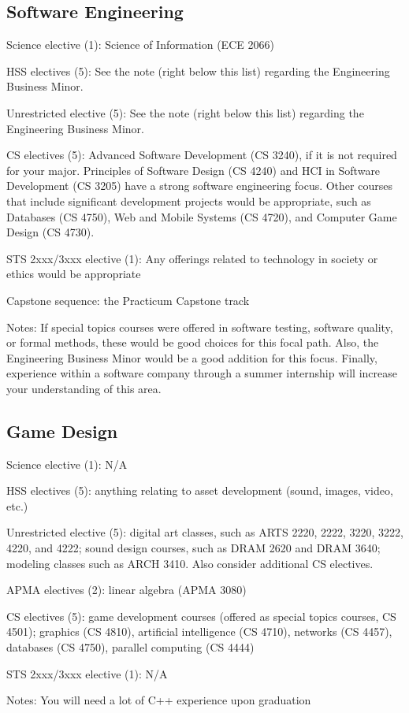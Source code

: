 \subsection{Software Engineering}
\begin{itemlist}
\item Science elective (1): Science of Information (ECE 2066)
\item HSS electives (5): See the note (right below this list)
  regarding the Engineering Business Minor.
\item Unrestricted elective (5): See the note (right below this list)
  regarding the Engineering Business Minor.
\item CS electives (5): Advanced Software Development (CS 3240), if it
  is not required for your major.  Principles of Software Design (CS
  4240) and HCI in Software Development (CS 3205) have a strong
  software engineering focus. Other courses that include significant
  development projects would be appropriate, such as Databases (CS
  4750), Web and Mobile Systems (CS 4720), and Computer Game Design
  (CS 4730).
\item STS 2xxx/3xxx elective (1): Any offerings related to technology
  in society or ethics would be appropriate
\item Capstone sequence: the Practicum Capstone track
\end{itemlist}

Notes: If special topics courses were offered in software testing,
software quality, or formal methods, these would be good choices for
this focal path. Also, the Engineering Business Minor would be a good
addition for this focus. Finally, experience within a software company
through a summer internship will increase your understanding of this
area.


\subsection{Game Design}
\begin{itemlist}
\item Science elective (1): N/A
\item HSS electives (5): anything relating to asset development
  (sound, images, video, etc.)
\item Unrestricted elective (5): digital art classes, such as ARTS
  2220, 2222, 3220, 3222, 4220, and 4222; sound design courses, such
  as DRAM 2620 and DRAM 3640; modeling classes such as ARCH 3410.
  Also consider additional CS electives.
\item APMA electives (2): linear algebra (APMA 3080)
\item CS electives (5): game development courses (offered as special
  topics courses, CS 4501); graphics (CS 4810), artificial
  intelligence (CS 4710), networks (CS 4457), databases (CS 4750),
  parallel computing (CS 4444)
\item STS 2xxx/3xxx elective (1): N/A
\item Notes: You will need a lot of C++ experience upon graduation
\end{itemlist}

